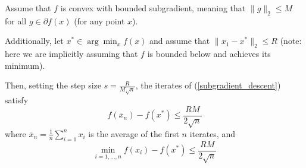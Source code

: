 \begin{theorem}\label{original_subgradient}
 Assume that $f$ is convex with bounded subgradient, meaning that $\|g\|_2 \leq M$ for all $g\in \partial f(x)$ (for any point $x$).
 
 Additionally, let $x^*\in \arg\min_x f(x)$ and assume that $\|x_1 - x^*\|_2 \leq R$ (note: here we are implicitly assuming that
 $f$ is bounded below and achieves its minimum). 
 
 Then, setting the step size $s = \frac{R}{M\sqrt{n}}$,
 the iterates of (\ref{subgradient_descent}) satisfy
 \begin{equation}
  f(\bar{x}_n) - f(x^*) \leq \frac{RM}{2\sqrt{n}}
 \end{equation}
 where $\bar{x}_n = \frac{1}{n}\sum_{i = 1}^n x_i$ is the average of the first $n$ iterates, and
 \begin{equation}
  \min_{i=1,...,n} f(x_i) - f(x^*) \leq \frac{RM}{2\sqrt{n}}
 \end{equation}


\end{theorem}
